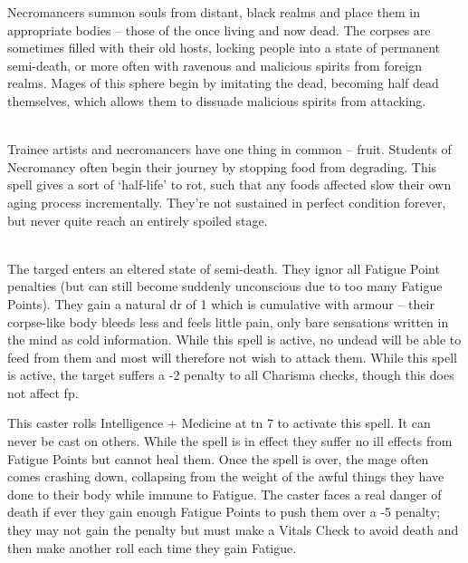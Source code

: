 \begin{multicols}{2}

Necromancers summon souls from distant, black realms and place them in appropriate bodies -- those of the once living and now dead. The corpses are sometimes filled with their old hosts, locking people into a state of permanent semi-death, or more often with ravenous and malicious spirits from foreign realms. Mages of this sphere begin by imitating the dead, becoming half dead themselves, which allows them to dissuade malicious spirits from attacking.

\spelllevel

\\
Trainee artists and necromancers have one thing in common -- fruit.
Students of Necromancy often begin their journey by stopping food from degrading.
This spell gives a sort of `half-life' to rot, such that any foods affected slow their own aging process incrementally.
They're not sustained in perfect condition forever, but never quite reach an entirely spoiled stage.

\\
The targed enters an eltered state of semi-death. They ignor all Fatigue Point penalties (but can still become suddenly unconscious due to too many Fatigue Points). They gain a natural \gls{dr} of 1 which is cumulative with armour -- their corpse-like body bleeds less and feels little pain, only bare sensations written in the mind as cold information. While this spell is active, no undead will be able to feed from them and most will therefore not wish to attack them. While this spell is active, the target suffers a -2 penalty to all Charisma checks, though this does not affect \gls{fp}.

This caster rolls Intelligence + Medicine at \gls{tn} 7 to activate this spell. It can never be cast on others. While the spell is in effect they suffer no ill effects from Fatigue Points but cannot heal them. Once the spell is over, the mage often comes crashing down, collapsing from the weight of the awful things they have done to their body while immune to Fatigue. The caster faces a real danger of death if ever they gain enough Fatigue Points to push them over a -5 penalty; they may not gain the penalty but must make a Vitals Check to avoid death and then make another roll each time they gain Fatigue.



\end{multicols}

